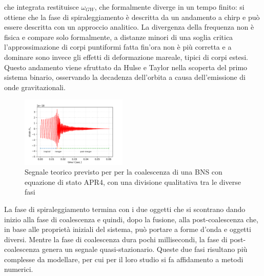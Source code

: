 che integrata restituisce $\omega_{GW}$, che formalmente diverge in un tempo finito: si ottiene che la fase di spiraleggiamento è descritta da un andamento a chirp e può essere descritta con un approccio analitico. La divergenza della frequenza non è fisica e compare solo formalmente, a distanze minori di una soglia critica l'approssimazione di corpi puntiformi fatta fin'ora non è più corretta e a dominare sono invece gli effetti di deformazione mareale, tipici di corpi estesi. Questo andamento viene sfruttato da Hulse e Taylor nella scoperta del primo sistema binario, osservando la decadenza dell'orbita a causa dell'emissione di onde gravitazionali.
\begin{figure}
	\vspace{-10pt}
	\begin{center}
		\includegraphics[width=0.45\textwidth]{figures/Capitolo_1/APR4.pdf}
	\end{center}
	\vspace{-11pt}
	\caption{Segnale teorico previsto per per la coalescenza di una BNS con equazione di stato APR4, con una divisione qualitativa tra le diverse fasi}
	\label{fig:forma_onda_APR4}
	\vspace{-10pt}
\end{figure}
La fase di spiraleggiamento termina con i due oggetti che si scontrano dando inizio alla fase di coalescenza e quindi, dopo la fusione, alla post-coalescenza che, in base alle proprietà iniziali del sistema, può portare a forme d'onda e oggetti diversi.	Mentre la fase di coalescenza dura pochi millisecondi, la fase di post-coalescenza genera un segnale quasi-stazionario. Queste due fasi risultano più complesse da modellare, per cui per il loro studio si fa affidamento a metodi numerici. \cite{maggiore2008gravitational}

